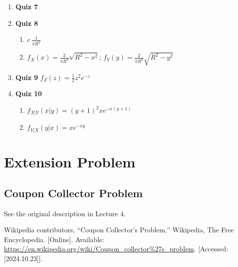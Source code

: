 \documentclass{article}
\begin{document}
\begin{enumerate}
\item \textbf{\large Quiz 7}


\item \textbf{\large Quiz 8}
\begin{enumerate}
    \item $c \ \frac{1}{\pi R^2}$
    \item $f_X(x) = \frac{2}{\pi R^2}\sqrt{R^2 - x^2}$;  $f_Y(y) = \frac{2}{\pi R^2}\sqrt{R^2 - y^2}$
\end{enumerate}

\item \textbf{\large Quiz 9}
     $f_Z(z) = \frac{1}{2}z^2e^{-z}$



\item \textbf{\large Quiz 10}
\begin{enumerate}
    \item $f_{X|Y}(x|y) = (y+1)^2 xe^{-x(y+1)}$
    \item $f_{Y|X}(y|x) = xe^{-xy}$
\end{enumerate}
\end{enumerate}


\newpage

\section{Extension Problem}
\subsection{Coupon Collector Problem}
See the original description in Lecture 4.




\newpage




\begin{thebibliography}{1}

Wikipedia contributors, ``Coupon Collector's Problem,'' Wikipedia, The Free Encyclopedia. [Online]. Available: \url{https://en.wikipedia.org/wiki/Coupon_collector%27s_problem}. [Accessed: [2024.10.23]].

\end{thebibliography}
\end{document}
